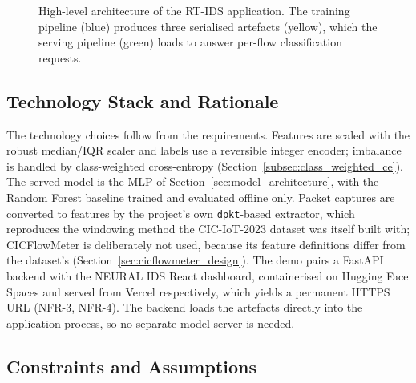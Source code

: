 \begin{figure}[htbp]
{%
    }
    \caption{High-level architecture of the RT-IDS application. The training pipeline (blue) produces three serialised artefacts (yellow), which the serving pipeline (green) loads to answer per-flow classification requests.}
    \label{fig:system_architecture}
\end{figure}

\subsection{Technology Stack and Rationale}
\label{subsec:tech_stack}

\par The technology choices follow from the requirements. Features are scaled with the robust median/IQR scaler and labels use a reversible integer encoder; imbalance is handled by class-weighted cross-entropy (Section~\ref{subsec:class_weighted_ce}). The served model is the MLP of Section~\ref{sec:model_architecture}, with the Random Forest baseline trained and evaluated offline only. Packet captures are converted to features by the project's own \texttt{dpkt}-based extractor, which reproduces the windowing method the CIC-IoT-2023 dataset was itself built with; CICFlowMeter is deliberately not used, because its feature definitions differ from the dataset's (Section~\ref{sec:cicflowmeter_design}). The demo pairs a FastAPI backend with the NEURAL IDS React dashboard, containerised on Hugging Face Spaces and served from Vercel respectively, which yields a permanent HTTPS URL (NFR-3, NFR-4). The backend loads the artefacts directly into the application process, so no separate model server is needed.

\subsection{Constraints and Assumptions}
\label{subsec:constraints}


